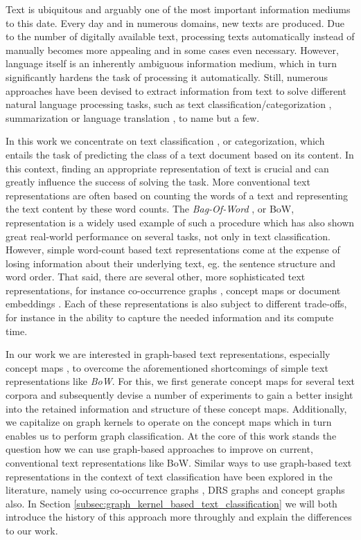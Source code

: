 Text is ubiquitous and arguably one of the most important information mediums to this date.
Every day and in numerous domains, new texts are produced.
Due to the number of digitally available text, processing texts automatically instead of manually becomes more appealing and in some cases even necessary.
However, language itself is an inherently ambiguous information medium, which in turn significantly hardens the task of processing it automatically.
Still, numerous approaches have been devised to extract information from text to solve different natural language processing tasks, such as text classification/categorization \cite[p.~575]{Manning2000}, summarization \cite{Mani1999} or language translation \cite{Weaver1955}, to name but a few.

In this work we concentrate on text classification \cite[p.~232]{Manning2000}, or categorization, which entails the task of predicting the class of a text document based on its content.
In this context, finding an appropriate representation of text is crucial and can greatly influence the success of solving the task.
More conventional text representations are often based on counting the words of a text and representing the text content by these word counts.
The \textit{Bag-Of-Word} \cite[p.~237]{Manning2000}, or BoW, representation is a widely used example of such a procedure which has also shown great real-world performance on several tasks, not only in text classification.
However, simple word-count based text representations come at the expense of losing information about their underlying text, eg. the sentence structure and word order.
That said, there are several other, more sophisticated text representations, for instance co-occurrence graphs \cite{Rousseau2013}, concept maps \cite{Novak2008,Falke2017b} or document embeddings \cite{Dai2015,Lau2016}.
Each of these representations is also subject to different trade-offs, for instance in the ability to capture the needed information and its compute time.

In our work we are interested in graph-based text representations, especially concept maps \cite{Novak2008,Falke2017b}, to overcome the aforementioned shortcomings of simple text representations like \textit{BoW}.
For this, we first generate concept maps for several text corpora and subsequently devise a number of experiments to gain a better insight into the retained information and structure of these concept maps.
Additionally, we capitalize on graph kernels \cite{Kulharia2008} to operate on the concept maps which in turn enables us to perform graph classification.
At the core of this work stands the question how we can use graph-based approaches to improve on current, conventional text representations like BoW.
Similar ways to use graph-based text representations in the context of text classification have been explored in the literature, namely using co-occurrence graphs \cite{Rousseau2015a, Nikolentzos2017b}, DRS graphs \cite{Gaspar2011} and concept graphs \cite{Gulrandhe2015} also.
In Section \ref{subsec:graph_kernel_based_text_classification} we will both introduce the history of this approach more throughly and explain the differences to our work.

